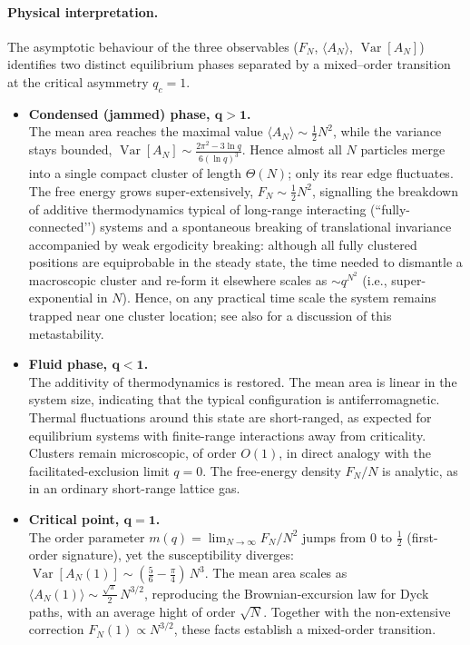 \documentclass[pdflatex,sn-mathphys-num]{sn-jnl}
\theoremstyle{definition}
\theoremstyle{remark}
\numberwithin{equation}{section}
\begin{document}
\paragraph*{Physical interpretation.}
The asymptotic behaviour of the three observables
($F_N$, $\langle A_N\rangle$, $\operatorname{Var}[A_N]$)
identifies two distinct equilibrium phases separated by a mixed–order
transition at the critical asymmetry \(q_c=1\).
\begin{itemize}
\item \textbf{Condensed (jammed) phase, \(\boldsymbol{q>1}\).}\\[2pt]
  The mean area reaches the maximal value
  \(\langle A_N\rangle\sim \tfrac12 N^{2}\),
  while the variance stays bounded,
  \(\operatorname{Var}[A_N]\sim
    \tfrac{2\pi^{2}-3\ln q}{6(\ln q)^{3}}\).
  Hence almost all \(N\) particles merge into a single compact cluster
  of length \(\Theta(N)\); only its rear edge fluctuates.
  The free energy grows super-extensively,
  \(F_N\sim\tfrac12 N^{2}\), signalling the breakdown of additive
  thermodynamics typical of long-range interacting (“fully-connected’’)
  systems and a spontaneous breaking of translational invariance accompanied by weak ergodicity breaking: although all fully clustered positions are equiprobable in the steady state, the time needed to dismantle a macroscopic cluster and re-form it elsewhere scales as \(\sim q^{N^{2}}\) (i.e., super-exponential in \(N\)). Hence, on any practical time scale the system remains trapped near one cluster location; see also \cite{grosskinsky2025long} for a discussion of this metastability.
\item \textbf{Fluid phase, \(\boldsymbol{q<1}\).}\\[2pt]
The additivity of thermodynamics is restored. The mean area is linear in the system size, indicating that the typical configuration is antiferromagnetic. Thermal fluctuations around this state are short-ranged, as expected for equilibrium systems with finite-range interactions away from criticality. Clusters remain microscopic, of order \(O(1)\), in direct analogy with the facilitated-exclusion limit \(q=0\). The free-energy density \(F_N/N\) is analytic, as in an ordinary short-range lattice gas.

\item \textbf{Critical point, \(\boldsymbol{q=1}\).}\\[2pt]
  The order parameter
  \(m(q)=\displaystyle\lim_{N\to\infty}F_N/N^{2}\)
  jumps from \(0\) to \(\tfrac12\) (first-order signature),
  yet the susceptibility diverges:
  \(\operatorname{Var}[A_N(1)]\sim
    (\tfrac56-\tfrac\pi4)\,N^{3}\).
  The mean area scales as
  \(\langle A_N(1)\rangle\sim
    \tfrac{\sqrt\pi}{2}\,N^{3/2}\),
  reproducing the Brownian-excursion law for Dyck paths, with an average hight of order $\sqrt{N}$.
  Together with the non-extensive correction
  \(F_N(1)\propto N^{3/2}\),
  these facts establish a mixed-order transition.
\end{itemize}
\end{document}
